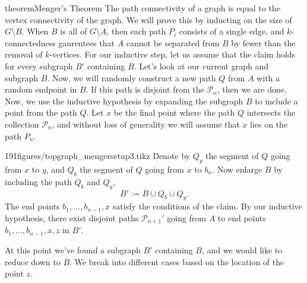 \begin{doubledpage}{theorem}{Menger's Theorem}{
	The path connectivity of a graph is equal to the vertex connectivity of the graph.  }
We will prove this by inducting  on the size of $G\setminus B$. When $B$ is all of $G\setminus A$, then each path $P_i$ consists of a single edge, and $k$-connectedness gaurentees that $A$ cannot be separated from $B$ by fewer than the removal of $k$-vertices.
For our inductive step, let us assume that the claim holds for every subgraph $B'$ containing $B$.  Let's look at our current graph and subgraph $B$. 
Now, we will randomly construct a new path $Q$ from $A$ with a  random endpoint in $B$.
If this path is disjoint from the $\mathcal P_n$, then we are done.
Now, we use the inductive hypothesis by expanding the subgraph $B$ to include a point from the path $Q$. Let $x$ be the final point where the path $Q$ intersects the collection $\mathcal P_n$, and without loss of generality we will assume that $x$ lies on the path $P_n$.
\begin{paragraphfigureenv}{191figures/topgraph_mengersetup3.tikz}
     Denote by $Q_y$ the segment of $Q$ going from $x$ to $y$, and $Q_b$ the segment of $Q$ going from $x$ to $b_n$.  Now  enlarge $B$ by including the path $Q_b$ and $Q_y$, 
\[B':= B\cup Q_b\cup Q_y.\]
The end points $b_1, \ldots, b_{n-1}, x$ satisfy the conditions of the claim.  By our inductive hypothesis, there exist disjoint paths $\mathcal P_{n+1}'$ going from $A$ to end points $b_1, \ldots, b_{n-1}, x, z$ in $B'$. 
\end{paragraphfigureenv}

At this point we've found a subgraph $B'$ containing $B$, and we would like to reduce down to $B$.
We break into different cases based on the location of the point $z$. 


\end{doubledpage}
